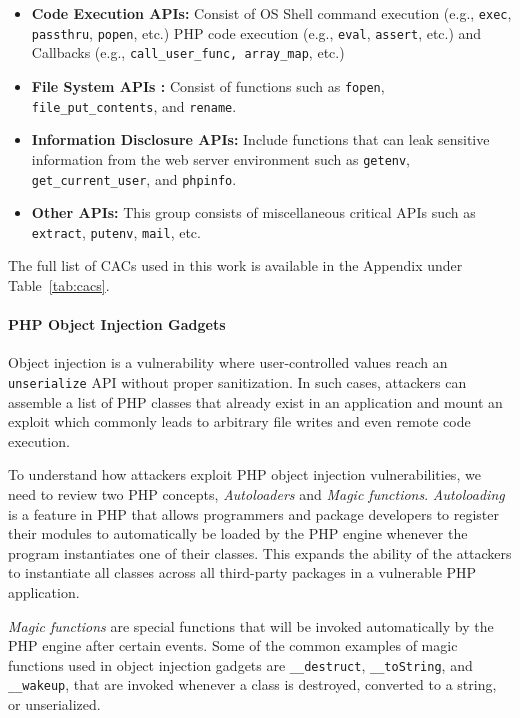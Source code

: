 \begin{itemize}
    \item \textbf{Code Execution APIs:} Consist of OS Shell command execution (e.g., \texttt{exec}, \texttt{passthru}, \texttt{popen}, etc.) PHP code execution (e.g., \texttt{eval}, \texttt{assert}, etc.) and Callbacks (e.g., \texttt{call\_user\_func, array\_map}, etc.)
    \item \textbf{File System APIs :} Consist of functions such as \texttt{fopen}, \texttt{file\_put\_contents}, and \texttt{rename}.
    \item \textbf{Information Disclosure APIs:} Include functions that can leak sensitive information from the web server environment such as \texttt{getenv}, \texttt{get\_current\_user}, and \texttt{phpinfo}.
    \item \textbf{Other APIs:} This group consists of miscellaneous critical APIs such as \texttt{extract}, \texttt{putenv}, \texttt{mail}, etc.
\end{itemize}

The full list of CACs used in this work is available in the Appendix under Table~\ref{tab:cacs}.
    
\paragraph{PHP Object Injection Gadgets}
Object injection is a vulnerability where user-controlled values reach an \texttt{unserialize} API without proper sanitization. 
In such cases, attackers can assemble a list of PHP classes that already exist in an application and mount an exploit which commonly leads to arbitrary file writes and even remote code execution. 

To understand how attackers exploit PHP object injection vulnerabilities, we need to review two PHP concepts, \emph{Autoloaders} and \emph{Magic functions}. 
\emph{Autoloading} is a feature in PHP that allows programmers and package developers to register their modules to automatically be loaded by the PHP engine whenever the program instantiates one of their classes. 
This expands the ability of the attackers to instantiate all classes across all third-party packages in a vulnerable PHP application. 

\emph{Magic functions} are special functions that will be invoked automatically by the PHP engine after certain events. 
Some of the common examples of magic functions used in object injection gadgets are \texttt{\_\_destruct}, \texttt{\_\_toString}, and \texttt{\_\_wakeup}, that are invoked whenever a class is destroyed, converted to a string, or unserialized. 

